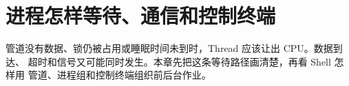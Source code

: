 \chapter{进程怎样等待、通信和控制终端}

管道没有数据、锁仍被占用或睡眠时间未到时，Thread 应该让出 CPU。数据到达、
超时和信号又可能同时发生。本章先把这条等待路径画清楚，再看 Shell 怎样用
管道、进程组和控制终端组织前后台作业。







